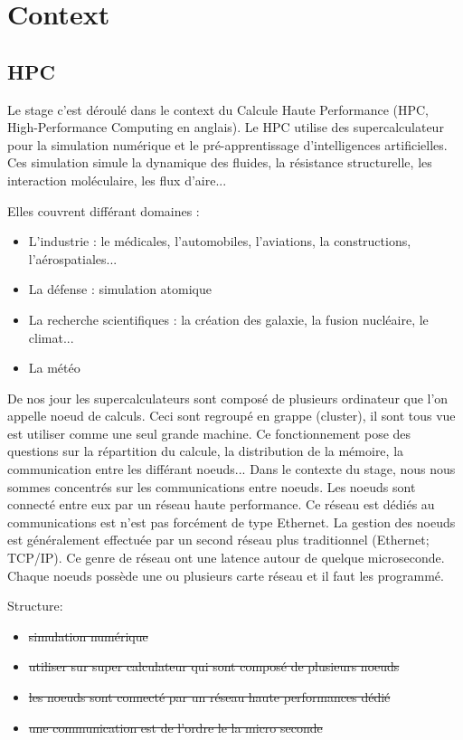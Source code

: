 \section{Context}

\subsection{HPC}

Le stage c'est déroulé dans le context du Calcule Haute Performance (HPC, High-Performance Computing en anglais).
Le HPC utilise des supercalculateur pour la simulation numérique et le pré-apprentissage d'intelligences artificielles.
Ces simulation simule la dynamique des fluides, la résistance structurelle, les interaction moléculaire, les flux d'aire...

\bigskip

Elles couvrent différant domaines :
\begin{itemize}
  \item L'industrie : le médicales, l'automobiles, l'aviations, la constructions, l'aérospatiales...
  \item La défense : simulation atomique
  \item La recherche scientifiques : la création des galaxie, la fusion nucléaire, le climat...
  \item La météo
\end{itemize}

\bigskip

De nos jour les supercalculateurs sont composé de plusieurs ordinateur que l'on appelle noeud de calculs.
Ceci sont regroupé en grappe (cluster), il sont tous vue est utiliser comme une seul grande machine.
Ce fonctionnement pose des questions sur la répartition du calcule, la distribution de la mémoire, la communication entre les différant noeuds...
Dans le contexte du stage, nous nous sommes concentrés sur les communications entre noeuds.
Les noeuds sont connecté entre eux par un réseau haute performance.
Ce réseau est dédiés au communications est n'est pas forcément de type Ethernet.
La gestion des noeuds est généralement effectuée par un second réseau plus traditionnel (Ethernet; TCP/IP).
Ce genre de réseau ont une latence autour de quelque microseconde.
Chaque noeuds possède une ou plusieurs carte réseau et il faut les programmé.

\bigskip
Structure:
\begin{itemize}
  \item \st{simulation numérique}
  \item \st{utiliser sur super calculateur qui sont composé de plusieurs noeuds}
  \item \st{les noeuds sont connecté par un réseau haute performances dédié}
  \item \st{une communication est de l'ordre le la micro seconde}
\end{itemize}

